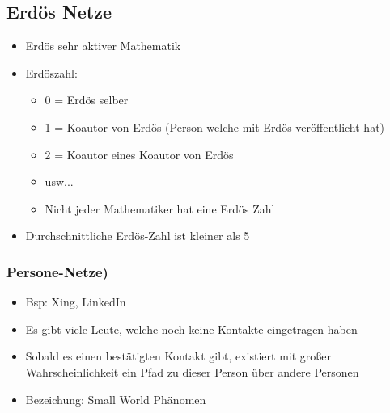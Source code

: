 \documentclass{article} %
\begin{document}
	\subsection{Erdös Netze}
	\begin{itemize}
		\item Erdös sehr aktiver Mathematik
		\item Erdöszahl:
		\begin{itemize}
			\item 0 = Erdös selber
			\item 1 = Koautor von Erdös (Person welche mit Erdös veröffentlicht hat)
			\item 2 = Koautor eines Koautor von Erdös 
			\item usw...
			\item Nicht jeder Mathematiker hat eine Erdös Zahl
		\end{itemize}
		\item Durchschnittliche Erdös-Zahl ist kleiner als 5
	\end{itemize}
	\subsubsection{Persone-Netze)}
	\begin{itemize}
		\item Bsp: Xing, LinkedIn
		\item Es gibt viele Leute, welche noch keine Kontakte eingetragen haben
		\item Sobald es einen bestätigten Kontakt gibt, existiert mit großer Wahrscheinlichkeit ein Pfad zu dieser Person über andere Personen
		\item Bezeichung: Small World Phänomen
	\end{itemize}
\end{document}
